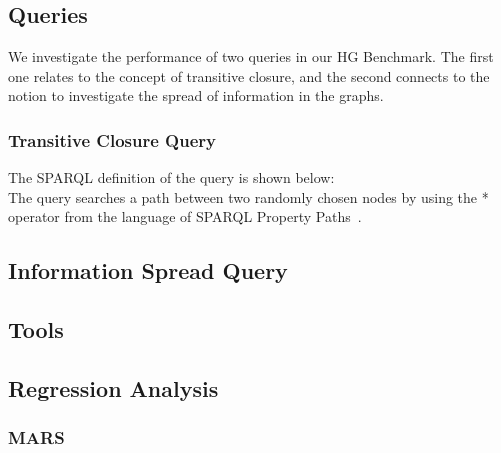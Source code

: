 \subsection{Queries}

We investigate the performance of two queries in our HG Benchmark. The first one relates to the concept of transitive closure, and the second connects to the notion to investigate the spread of information in the graphs.

\subsubsection{Transitive Closure Query}

The SPARQL definition of the query is shown below:\\


The query searches a path between two randomly chosen nodes by using the \textsf{*} operator from the language of SPARQL Property Paths~\cite{property_path}.

\subsection{Information Spread Query}


\subsection{Tools}

\subsection{Regression Analysis}

\subsubsection{MARS}


